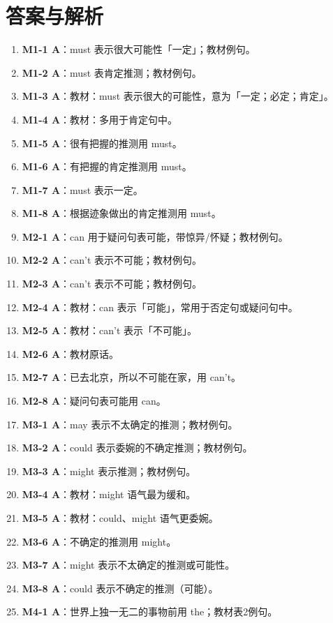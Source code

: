\documentclass[11pt,a4paper]{ctexart}
\begin{document}
\section*{答案与解析}
\small
\begin{enumerate}[leftmargin=1.6em,itemsep=2pt]
\item \textbf{M1-1 A}：must 表示很大可能性「一定」；教材例句。
\item \textbf{M1-2 A}：must 表肯定推测；教材例句。
\item \textbf{M1-3 A}：教材：must 表示很大的可能性，意为「一定；必定；肯定」。
\item \textbf{M1-4 A}：教材：多用于肯定句中。
\item \textbf{M1-5 A}：很有把握的推测用 must。
\item \textbf{M1-6 A}：有把握的肯定推测用 must。
\item \textbf{M1-7 A}：must 表示一定。
\item \textbf{M1-8 A}：根据迹象做出的肯定推测用 must。
\item \textbf{M2-1 A}：can 用于疑问句表可能，带惊异/怀疑；教材例句。
\item \textbf{M2-2 A}：can’t 表示不可能；教材例句。
\item \textbf{M2-3 A}：can’t 表示不可能；教材例句。
\item \textbf{M2-4 A}：教材：can 表示「可能」，常用于否定句或疑问句中。
\item \textbf{M2-5 A}：教材：can’t 表示「不可能」。
\item \textbf{M2-6 A}：教材原话。
\item \textbf{M2-7 A}：已去北京，所以不可能在家，用 can’t。
\item \textbf{M2-8 A}：疑问句表可能用 can。
\item \textbf{M3-1 A}：may 表示不太确定的推测；教材例句。
\item \textbf{M3-2 A}：could 表示委婉的不确定推测；教材例句。
\item \textbf{M3-3 A}：might 表示推测；教材例句。
\item \textbf{M3-4 A}：教材：might 语气最为缓和。
\item \textbf{M3-5 A}：教材：could、might 语气更委婉。
\item \textbf{M3-6 A}：不确定的推测用 might。
\item \textbf{M3-7 A}：might 表示不太确定的推测或可能性。
\item \textbf{M3-8 A}：could 表示不确定的推测（可能）。
\item \textbf{M4-1 A}：世界上独一无二的事物前用 the；教材表2例句。

\end{enumerate}
\end{document}
